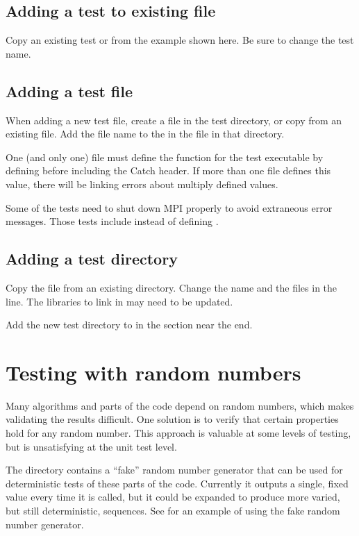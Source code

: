 \subsection{Adding a test to existing file}
Copy an existing test or from the example shown here.  Be sure to change the test name.

\subsection{Adding a test file}
When adding a new test file,
create a file in the test directory, or copy from an existing file.  Add the file name to the  in the  file in that directory.

One (and only one) file must define the  function for the test executable by defining  before including the Catch header.  If more than one file defines this value, there will be linking errors about multiply defined values.

Some of the tests need to shut down MPI properly to avoid extraneous error messages. Those tests include  instead of defining .


\subsection{Adding a test directory}
Copy the  file from an existing  directory.
Change the  name and the  files in the  line.  The libraries to link in  may need to be updated.

Add the new test directory to  in the  section near the end.


\section{Testing with random numbers}
Many algorithms and parts of the code depend on random numbers, which makes validating the results difficult.
One solution is to verify that certain properties hold for any random number.
This approach is valuable at some levels of testing, but is unsatisfying at the unit test level.

The  directory contains a ``fake'' random number generator that can be used for deterministic tests of these parts of the code.
Currently it outputs a single, fixed value every time it is called, but it could be expanded to produce more varied, but still deterministic, sequences.
See  for an example of using the fake random number generator.
